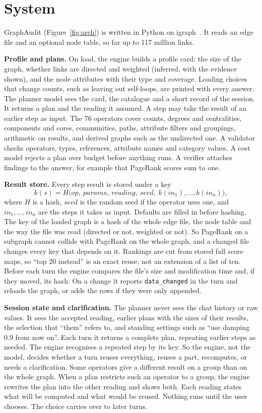 \documentclass[sigconf,9pt]{acmart}
\newcommand{\sys}{GraphAudit}
\begin{document}
\section{System}
\label{sec:system}

\sys{} (Figure~\ref{fig:arch}) is written in Python on igraph~\cite{igraph}. It reads an edge file and an optional node table, so far up to 117 million links.

\textbf{Profile and plans.} On load, the engine builds a profile card: the size of the graph, whether
links are directed and weighted (inferred, with the evidence shown), and the node attributes with their
type and coverage. Loading choices that change counts, such as leaving out self-loops, are printed with
every answer. The planner model sees the card, the catalogue and a short record of the session. It
returns a plan and the reading it assumed. A step may take the result of an earlier step as input. The 76
operators cover counts, degrees and centralities, components and cores, communities, paths, attribute
filters and groupings, arithmetic on results, and derived graphs such as the undirected one. A validator checks operators, types, references, attribute names and category values. A cost
model rejects a plan over budget before anything runs. A verifier attaches findings to the answer, for
example that PageRank scores sum to one.

\textbf{Result store.} Every step result is stored under a key
\[
k(s)=H\bigl(\mathit{op},\ \mathit{params},\ \mathit{reading},\ \mathit{seed},\
k(\mathit{in}_1),\dots,k(\mathit{in}_n)\bigr),
\]
where $H$ is a hash, $\mathit{seed}$ is the random seed if the operator uses one, and
$\mathit{in}_1,\dots,\mathit{in}_n$ are the steps it takes as input. Defaults are filled in before hashing. The key of the loaded graph is a hash of the whole edge file, the
node table and the way the file was read (directed or not, weighted or not). So PageRank on a subgraph
cannot collide with PageRank on the whole graph, and a changed file changes every key that depends on it.
Rankings are cut from stored full score maps, so ``top 20 instead'' is an exact reuse, not an extension
of a list of ten. Before each turn the engine compares the file's size and modification time and, if they
moved, its hash. On a change it reports \texttt{data\_changed} in the turn and reloads the graph, or adds the rows if they were only appended.

\textbf{Session state and clarification.} The planner never sees the chat history or raw values. It sees
the accepted reading, earlier plans with the sizes of their results, the selection that ``them'' refers to,
and standing settings such as ``use damping 0.9 from now on''. Each turn it returns a complete plan, repeating earlier steps as needed. The engine recognises a repeated step by its key. So the
engine, not the model, decides whether a turn reuses everything, reuses a part, recomputes, or needs a
clarification. Some operators give a different result on a group than on the whole graph. When a plan
restricts such an operator to a group, the engine rewrites the plan into the other reading and shows both.
Each reading states what will be computed and what would be reused. Nothing runs
until the user chooses. The choice carries over to later turns.
\end{document}
